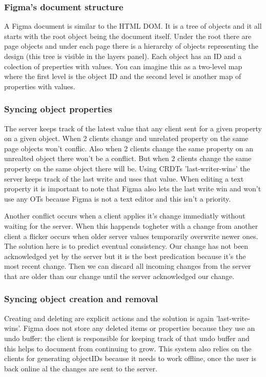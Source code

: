 \subsubsection*{Figma's document structure}

A Figma document is similar to the HTML DOM. It is a tree of objects and it all starts with the root object being the document itself. Under the root there are page objects and under each page there is a hierarchy of objects representing the design (this tree is visible in the layers panel). Each object has an ID and a colection of preperties with values. You can imagine this as a two-level map where the first level is the object ID and the second level is another map of properties with values.

\subsubsection*{Syncing object properties}

The server keeps track of the latest value that any client sent for a given property on a given object. When 2 clients change and unrelated property on the same page objects won't conflic. Also when 2 clients change the same property on an unrealted object there won't be a conflict. But when 2 clients change the same property on the same object there will be. Using CRDTs 'last-writer-wins' the server keeps track of the last write and uses that value. When editing a text property it is important to note that Figma also lets the last write win and won't use any OTs because Figma is not a text editor and this isn't a priority.

Another conflict occurs when a client applies it's change immediatly without waiting for the server. When this happends togheter with a change from another client a flicker occurs when older server values temporarily overwrite newer ones. The solution here is to predict eventual consistency. Our change has not been acknowledged yet by the server but it is the best predication because it's the most recent change. Then we can discard all incoming changes from the server that are older than our change until the server acknowledged our change.

\subsubsection*{Syncing object creation and removal}

Creating and deleting are explicit actions and the solution is again 'last-write-wins'. Figma does not store any deleted items or properties because they use an undo buffer: the client is responsible for keeping track of that undo buffer and this helps to document from continuing to grow. This system also relies on the clients for generating objectIDs because it needs to work offline, once the user is back online al the changes are sent to the server.


